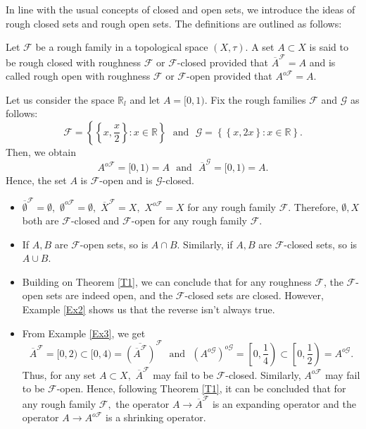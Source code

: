 \documentclass[11pt]{amsart}
\begin{document}
In line with the usual concepts of closed and open sets, we introduce the ideas of rough closed sets and rough open sets. The definitions are outlined as follows:

\begin{definition}
Let $\mathscr{F}$ be a rough family in a topological space $(X,\tau)$. A set $A\subset X$ is said to be rough closed with roughness $\mathscr{F}$ or $\mathscr{F}$-closed provided that $\overline{A}^\mathscr{F}=A$ and is called  rough open with roughness $\mathscr{F}$ or $\mathscr{F}$-open provided that $A^{o\mathscr{F}}=A$. 
\end{definition}

\begin{example}\label{Ex3}
    Let us consider the space $\mathbb{R}_l$ and let $A=[0,1).$ Fix the rough families $\mathscr{F}$ and $\mathcal{G}$ as follows: $$\mathscr{F}=\left\{\left\{x,\frac{x}{2}\right\}: x\in \mathbb{R}\right\}~~~\text{and}~~~\mathcal{G}=\left\{\left\{x,2x\right\}: x\in \mathbb{R}\right\}.$$ Then,
    we obtain $$A^{o\mathscr{F}}=[0,1)=A~~~\text{and}~~~\overline{A}^\mathcal{G}=[0,1)=A.$$  
    Hence, the set $A$ is $\mathscr{F}$-open and is $\mathcal{G}$-closed.
\end{example}


\begin{remark}\label{Rem2}
    \begin{itemize}
        \item[(i)]  $\overline{\emptyset}^\mathscr{F}=\emptyset,$ $\emptyset^{o\mathscr{F}}=\emptyset,$  $\overline{X}^\mathscr{F}=X,$ $X^{o\mathscr{F}}=X$ for any rough family $\mathscr{F}$. Therefore, $\emptyset, X$ both are $\mathscr{F}$-closed and $\mathscr{F}$-open for any rough family $\mathscr{F}$.
        
        \item[(ii)] If $A, B$ are $\mathscr{F}$-open sets, so is $A\cap B$. Similarly, if $A, B$ are $\mathscr{F}$-closed sets, so is $A\cup B$.


        \item[(iii)] Building on Theorem \ref{T1}, we can conclude that for any roughness $\mathscr{F}$, the $\mathscr{F}$-open sets are indeed open, and the $\mathscr{F}$-closed sets are closed. However, Example \ref{Ex2} shows us that the reverse isn't always true.

        \item[(iv)] From Example \ref{Ex3}, we get $$\overline{A}^\mathscr{F}=[0,2)\subset [0,4)=\overline{\left(\overline{A}^\mathscr{F}\right)}^{\mathscr{F}}   ~~~\text{and}~~~{\left(A^{o\mathcal{G}}\right)}^{o\mathcal{G}}=\left[0,\frac{1}{4}\right)\subset\left[0,\frac{1}{2}\right)=A^{o\mathcal{G}}.$$    
        Thus, for any set $A\subset X,$ $\overline{A}^\mathscr{F}$ may fail to be  $\mathscr{F}$-closed. Similarly, $A^{o\mathscr{F}}$ may fail to be  $\mathscr{F}$-open. Hence, following Theorem \ref{T1}, it can be concluded that for any rough family $\mathscr{F},$ the operator $A\to \overline{A}^\mathscr{F}$ is an expanding operator and the operator  $A\to A^{o\mathscr{F}}$ is a shrinking operator.
    \end{itemize}
\end{remark}
\end{document}
